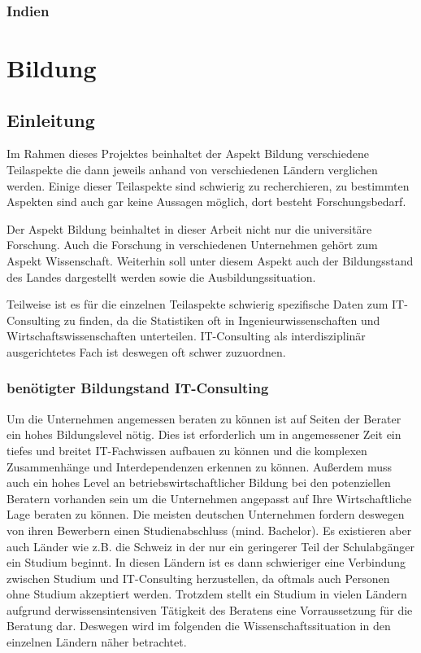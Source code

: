 	\subsection{Indien}
	

\chapter{Bildung}

\section{Einleitung}
Im Rahmen dieses Projektes beinhaltet der Aspekt Bildung verschiedene Teilaspekte die dann jeweils anhand von verschiedenen Ländern verglichen werden. Einige dieser Teilaspekte sind schwierig zu recherchieren, zu bestimmten Aspekten sind auch gar keine Aussagen möglich, dort besteht Forschungsbedarf. 

Der Aspekt Bildung beinhaltet in dieser Arbeit nicht nur die universitäre Forschung. Auch die Forschung in verschiedenen Unternehmen gehört zum Aspekt Wissenschaft. Weiterhin soll unter diesem Aspekt auch der Bildungsstand des Landes dargestellt werden sowie die Ausbildungssituation.

Teilweise ist es für die einzelnen Teilaspekte schwierig spezifische Daten zum IT-Consulting zu finden, da die Statistiken oft in Ingenieurwissenschaften und Wirtschaftswissenschaften unterteilen. IT-Consulting als interdisziplinär ausgerichtetes Fach ist deswegen oft schwer zuzuordnen. 

\subsection{ benötigter Bildungstand IT-Consulting}
Um die Unternehmen angemessen beraten zu können ist auf Seiten der Berater ein hohes Bildungslevel nötig. Dies ist erforderlich um in angemessener Zeit ein tiefes und breitet IT-Fachwissen aufbauen zu können und die komplexen Zusammenhänge und Interdependenzen erkennen zu können. Außerdem muss auch ein hohes Level an betriebswirtschaftlicher Bildung bei den potenziellen Beratern vorhanden sein um die Unternehmen angepasst auf Ihre Wirtschaftliche Lage beraten zu können.
Die meisten deutschen Unternehmen fordern deswegen von ihren Bewerbern einen Studienabschluss (mind. Bachelor). Es existieren aber auch Länder wie z.B. die Schweiz in der nur ein geringerer Teil der Schulabgänger ein Studium beginnt. In diesen Ländern ist es dann schwieriger eine Verbindung zwischen Studium und IT-Consulting herzustellen, da oftmals auch Personen ohne Studium akzeptiert werden.
Trotzdem stellt ein Studium in vielen Ländern aufgrund derwissensintensiven Tätigkeit des Beratens eine Vorraussetzung für die Beratung dar.
Deswegen wird im folgenden die Wissenschaftssituation in den einzelnen Ländern näher betrachtet.

